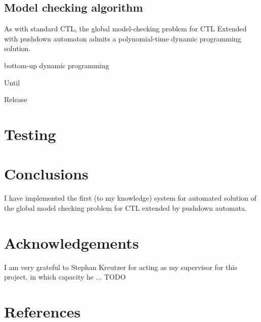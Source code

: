 \documentclass[11pt]{article}
\begin{document}
\subsection{Model checking algorithm}

As with standard CTL, the global model-checking problem for CTL Extended with pushdown automaton admits a polynomial-time dynamic programming solution.

bottom-up
dynamic programming


Until

Release

\cite{EHRS00b}

\section{Testing}

\section{Conclusions}

I have implemented the first (to my knowledge) system for automated solution of
the global model checking problem for CTL extended by pushdown automata.

\section{Acknowledgements}

I am very grateful to Stephan Kreutzer for acting as my supervisor for this project, in which capacity he ... TODO


\section{References}
{}

\end{document}

